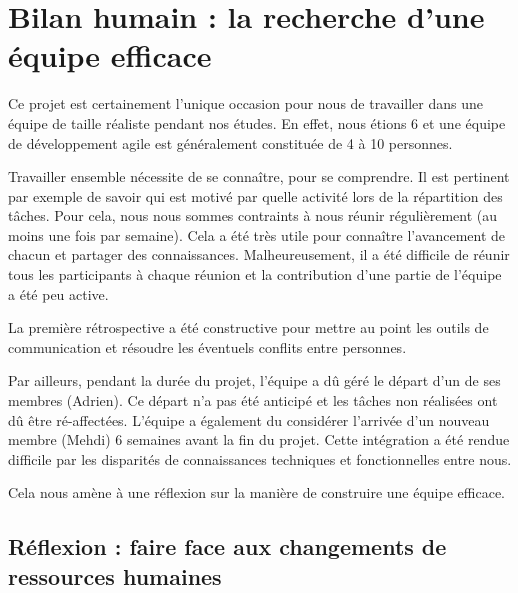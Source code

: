 \documentclass[a4paper,12pt]{article}
\begin{document}
\section{Bilan humain : la recherche d'une équipe efficace}

Ce projet est certainement l'unique occasion pour nous de travailler dans une équipe de taille réaliste pendant nos études. En effet, nous étions 6 et une équipe de développement agile est généralement constituée de 4 à 10 personnes.

Travailler ensemble nécessite de se connaître, pour se comprendre. Il est pertinent par exemple de savoir qui est motivé par quelle activité lors de la répartition des tâches. Pour cela, nous nous sommes contraints à nous réunir régulièrement (au moins une fois par semaine). Cela a été très utile pour connaître l'avancement de chacun et partager des connaissances. Malheureusement, il a été difficile de réunir tous les participants à chaque réunion et la contribution d'une partie de l'équipe a été peu active.

La première rétrospective a été constructive pour mettre au point les outils de communication et résoudre les éventuels conflits entre personnes.


Par ailleurs, pendant la durée du projet, l'équipe a dû géré le départ d'un de ses membres (Adrien). Ce départ n'a pas été anticipé et les tâches non réalisées ont dû être ré-affectées. 
L'équipe a également du considérer l'arrivée d'un nouveau membre (Mehdi) 6 semaines avant la fin du projet. Cette intégration a été rendue difficile par les disparités de connaissances techniques et fonctionnelles entre nous.

Cela nous amène à une réflexion sur la manière de construire une équipe efficace.

\subsection{Réflexion : faire face aux changements de ressources humaines}
\end{document}
